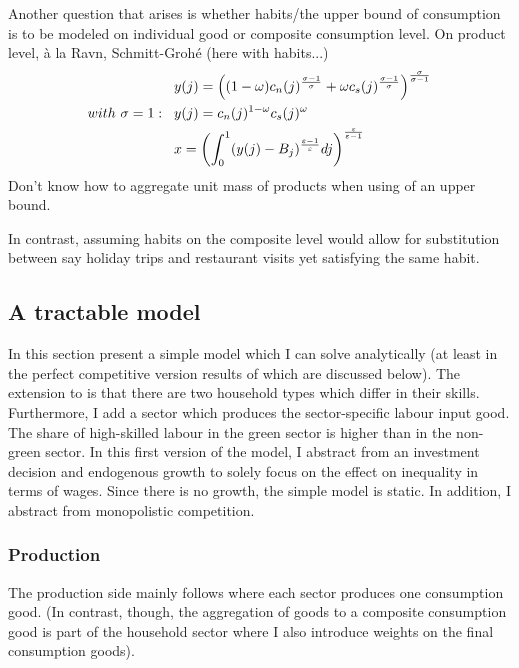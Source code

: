Another question that arises is whether habits/the upper bound of consumption is to be modeled on individual good or composite consumption level.
On product level, à la Ravn, Schmitt-Grohé (here with habits...)
\begin{align*}
&y(j)=\left((1-\omega)c_n(j)^{\frac{\sigma-1}{\sigma}} +\omega c_s(j)^{\frac{\sigma-1}{\sigma}}\right)^\frac{\sigma}{\sigma-1}\\
with\ \sigma =1: \hspace{3mm}& y(j)=c_n(j)^{1-\omega}c_s(j)^\omega \\
&	x= \left(\int_{0}^{1} (y(j)- B_j)^{\frac{\varepsilon-1}{\varepsilon}}dj\right)^{\frac{\varepsilon}{\varepsilon-1}}
\end{align*}
Don't know how to aggregate unit mass of products when using of an upper bound. 

In contrast, assuming habits on the composite level would allow for substitution between say holiday trips and restaurant visits yet satisfying the same habit.

\subsection{A tractable model}\label{subsec:Simplemodel}
In this section present a simple model which I can solve analytically (at least in the perfect competitive version results of which are discussed below). The extension to \cite{Acemoglu2012TheChange} is that there are two household types which differ in their skills. Furthermore, I add a sector which produces the sector-specific labour input good. The share of high-skilled labour in the green sector is higher than in the non-green sector. In this first version of the model, I abstract from an investment decision and endogenous growth to solely focus on the effect on inequality in terms of wages. Since there is no growth, the simple model is static. In addition, I abstract from monopolistic competition.

\subsubsection{Production}
The production side mainly follows \cite{Acemoglu2012TheChange} where each sector produces one consumption good. (In contrast, though, the aggregation of goods to a composite consumption good is part of the household sector where I also introduce weights on the final consumption goods). \\


